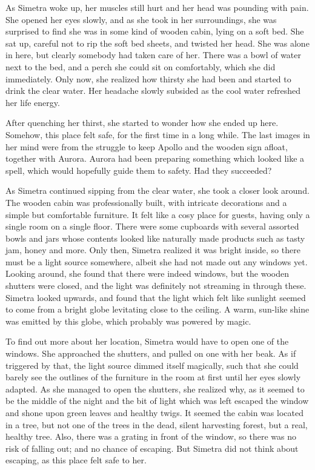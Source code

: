 \fancybreaker{}

As Simetra woke up, her muscles still hurt and her head was pounding with pain. She opened her eyes slowly, and as she took in her surroundings, she was surprised to find she was in some kind of wooden cabin, lying on a soft bed. She sat up, careful not to rip the soft bed sheets, and twisted her head. She was alone in here, but clearly somebody had taken care of her. There was a bowl of water next to the bed, and a perch she could sit on comfortably, which she did immediately. Only now, she realized how thirsty she had been and started to drink the clear water. Her headache slowly subsided as the cool water refreshed her life energy.

After quenching her thirst, she started to wonder how she ended up here. Somehow, this place felt safe, for the first time in a long while. The last images in her mind were from the struggle to keep Apollo and the wooden sign afloat, together with Aurora. Aurora had been preparing something which looked like a spell, which would hopefully guide them to safety. Had they succeeded?

As Simetra continued sipping from the clear water, she took a closer look around. The wooden cabin was professionally built, with intricate decorations and a simple but comfortable furniture. It felt like a cosy place for guests, having only a single room on a single floor. There were some cupboards with several assorted bowls and jars whose contents looked like naturally made products such as tasty jam, honey and more. Only then, Simetra realized it was bright inside, so there must be a light source somewhere, albeit she had not made out any windows yet. Looking around, she found that there were indeed windows, but the wooden shutters were closed, and the light was definitely not streaming in through these. Simetra looked upwards, and found that the light which felt like sunlight seemed to come from a bright globe levitating close to the ceiling. A warm, sun-like shine was emitted by this globe, which probably was powered by magic.

To find out more about her location, Simetra would have to open one of the windows. She approached the shutters, and pulled on one with her beak. As if triggered by that, the light source dimmed itself magically, such that she could barely see the outlines of the furniture in the room at first until her eyes slowly adapted. As she managed to open the shutters, she realized why, as it seemed to be the middle of the night and the bit of light which was left escaped the window and shone upon green leaves and healthy twigs. It seemed the cabin was located in a tree, but not one of the trees in the dead, silent harvesting forest, but a real, healthy tree. Also, there was a grating in front of the window, so there was no risk of falling out; and no chance of escaping. But Simetra did not think about escaping, as this place felt safe to her.

